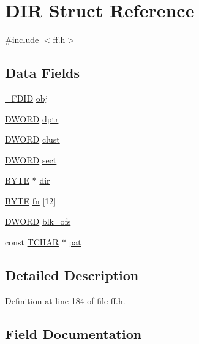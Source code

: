 \hypertarget{structDIR}{}\section{D\+IR Struct Reference}
\label{structDIR}


{\ttfamily \#include $<$ff.\+h$>$}

\subsection*{Data Fields}
\begin{DoxyCompactItemize}
\item 
\hyperlink{struct__FDID}{\+\_\+\+F\+D\+ID} \hyperlink{structDIR_a5a4848c51616bf4ad90518c211ca3bb3}{obj}
\item 
\hyperlink{integer_8h_ad342ac907eb044443153a22f964bf0af}{D\+W\+O\+RD} \hyperlink{structDIR_a0330e9554e1f38795debe4495156873e}{dptr}
\item 
\hyperlink{integer_8h_ad342ac907eb044443153a22f964bf0af}{D\+W\+O\+RD} \hyperlink{structDIR_acfbb8ba2d6e73b6f999ceffd1857c190}{clust}
\item 
\hyperlink{integer_8h_ad342ac907eb044443153a22f964bf0af}{D\+W\+O\+RD} \hyperlink{structDIR_ad01fcc812ed0dad11a593574336adc9e}{sect}
\item 
\hyperlink{integer_8h_a4ae1dab0fb4b072a66584546209e7d58}{B\+Y\+TE} $\ast$ \hyperlink{structDIR_a6c2a8c0cf2d55ae99775e93a16593449}{dir}
\item 
\hyperlink{integer_8h_a4ae1dab0fb4b072a66584546209e7d58}{B\+Y\+TE} \hyperlink{structDIR_ad90d974c0e7640307598c586bf141b32}{fn} \mbox{[}12\mbox{]}
\item 
\hyperlink{integer_8h_ad342ac907eb044443153a22f964bf0af}{D\+W\+O\+RD} \hyperlink{structDIR_afdb5d6302a88eaf5d43da0352ca2cc91}{blk\+\_\+ofs}
\item 
const \hyperlink{ff_8h_a03bdb8ce5895c7e261aadc2529637546}{T\+C\+H\+AR} $\ast$ \hyperlink{structDIR_a1f636884096de91deb97f59209d60e96}{pat}
\end{DoxyCompactItemize}


\subsection{Detailed Description}


Definition at line 184 of file ff.\+h.



\subsection{Field Documentation}
